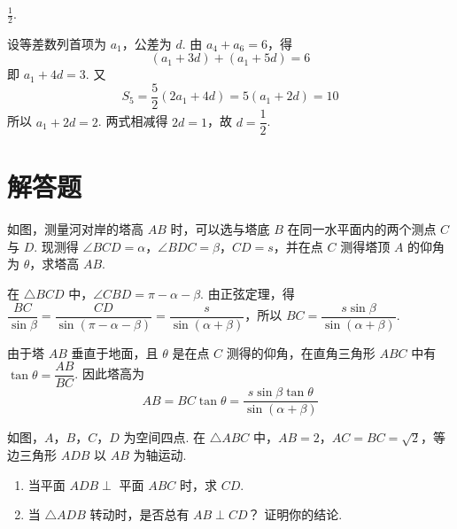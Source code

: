 \begin{answer}
\(\frac{1}{2}\).
\end{answer}

\begin{solution}
设等差数列首项为 \(a_1\)，公差为 \(d\). 由 \(a_4+a_6=6\)，得
\[
(a_1+3d)+(a_1+5d)=6
\]
即 \(a_1+4d=3\). 又
\[
S_5=\frac52(2a_1+4d)=5(a_1+2d)=10
\]
所以 \(a_1+2d=2\). 两式相减得 \(2d=1\)，故 \(d=\dfrac12\).
\end{solution}

\section{解答题}

\begin{problem}
如图，测量河对岸的塔高 \(AB\) 时，可以选与塔底 \(B\) 在同一水平面内的两个测点 \(C\) 与 \(D\). 现测得 \(\angle BCD = \alpha\)，\(\angle BDC = \beta\)，\(CD = s\)，并在点 \(C\) 测得塔顶 \(A\) 的仰角为 \(\theta\)，求塔高 \(AB\).
\end{problem}

\begin{solution}
在 \(\triangle BCD\) 中，\(\angle CBD=\pi-\alpha-\beta\). 由正弦定理，得
\(\dfrac{BC}{\sin\beta}=\dfrac{CD}{\sin(\pi-\alpha-\beta)}=\dfrac{s}{\sin(\alpha+\beta)}\)，所以 \(BC=\dfrac{s\sin\beta}{\sin(\alpha+\beta)}\).

由于塔 \(AB\) 垂直于地面，且 \(\theta\) 是在点 \(C\) 测得的仰角，在直角三角形 \(ABC\) 中有 \(\tan\theta=\dfrac{AB}{BC}\). 因此塔高为
\[
AB=BC\tan\theta=\frac{s\sin\beta\tan\theta}{\sin(\alpha+\beta)}
\]
\end{solution}

\begin{problem}
如图，\(A\)，\(B\)，\(C\)，\(D\) 为空间四点. 在 \(\triangle ABC\) 中，\(AB = 2\)，\(AC = BC = \sqrt{2}\)，等边三角形 \(ADB\) 以 \(AB\) 为轴运动.
\begin{enumerate}
\item 当平面 \(ADB \perp\) 平面 \(ABC\) 时，求 \(CD\).
\item 当 \(\triangle ADB\) 转动时，是否总有 \(AB \perp CD\)？ 证明你的结论.
\end{enumerate}

\end{problem}


